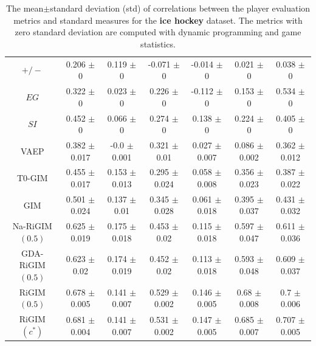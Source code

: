 \documentclass{article}
\newcommand{\sys}{RiGIM}
\begin{document}
\begin{table}[htbp]
{\begin{tabular}{ccccccc}
         $+/-$ & 0.206  $\pm$  0 & 0.119  $\pm$  0 & -0.071  $\pm$  0 & -0.014  $\pm$  0 & 0.021  $\pm$  0 & 0.038  $\pm$  0 \\
         $EG$ & 0.322  $\pm$  0 & 0.023  $\pm$  0 & 0.226  $\pm$  0 & -0.112  $\pm$  0 & 0.153  $\pm$  0 & 0.534  $\pm$  0 \\
         $SI$ & 0.452  $\pm$  0 & 0.066  $\pm$  0 & 0.274  $\pm$  0 & 0.138  $\pm$  0 & 0.224  $\pm$  0 & 0.405  $\pm$  0 \\
         VAEP & 0.382  $\pm$  0.017& -0.0  $\pm$  0.001& 0.321  $\pm$  0.01& 0.027  $\pm$  0.007& 0.086  $\pm$  0.002& 0.362  $\pm$  0.012 \\
         T0-GIM & 0.455 $\pm$ 0.017 & 0.153 $\pm$ 0.013 & 0.295 $\pm$ 0.024 & 0.058 $\pm$ 0.008 & 0.356 $\pm$ 0.023 & 0.387 $\pm$ 0.022 \\
         GIM & 0.501 $\pm$ 0.024 & 0.137 $\pm$ 0.01 & 0.345 $\pm$ 0.028 & 0.061 $\pm$ 0.018 & 0.395 $\pm$ 0.037 & 0.431 $\pm$ 0.032 \\
         Na-\sys$({0.5})$ & 0.625 $\pm$ 0.019 & 0.175 $\pm$ 0.018 & 0.453 $\pm$ 0.02 & 0.115 $\pm$ 0.018 & 0.597 $\pm$ 0.047 & 0.611 $\pm$ 0.036\\
         GDA-\sys$({0.5})$  & 0.623 $\pm$ 0.02 & 0.174 $\pm$ 0.019 & 0.452 $\pm$ 0.02 & 0.113 $\pm$ 0.018 & 0.593 $\pm$ 0.048 & 0.609 $\pm$ 0.037 \\
         \sys$(0.5)$ & 0.678 $\pm$ 0.005 & 0.141 $\pm$ 0.007 & 0.529 $\pm$ 0.002 & 0.146 $\pm$ 0.005 & 0.68 $\pm$ 0.008 & 0.7 $\pm$ 0.006 \\
         \sys$({c^{*}})$  & 0.681 $\pm$ 0.004 & 0.141 $\pm$ 0.007 & 0.531 $\pm$ 0.002 & 0.147 $\pm$ 0.005 & 0.685 $\pm$ 0.007 & 0.707 $\pm$ 0.005 \\
         \bottomrule
    \end{tabular}
    }
    \caption{The mean$\pm$standard deviation (std) of correlations between the player evaluation metrics and standard measures for the \textbf{ice hockey} dataset. The metrics with zero standard deviation are computed with dynamic programming and game statistics. }
    \label{table:Correlations-complete}
\end{table}
\end{document}
